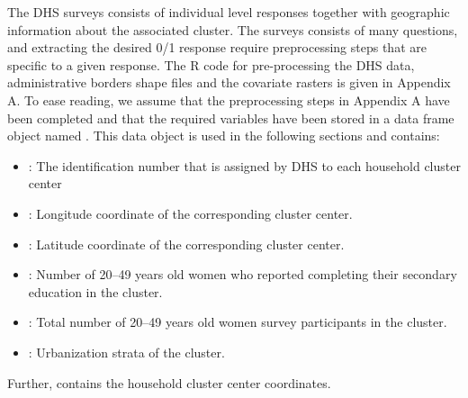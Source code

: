 The DHS surveys consists of individual level responses together with geographic information about the associated cluster. The surveys consists of many questions, and extracting the desired 0/1 response require preprocessing steps that are specific to a given response. 
The R code for pre-processing the DHS data, administrative borders shape files and the covariate rasters is given in Appendix A. To ease reading, we assume that the preprocessing steps in Appendix A have been completed and that the required variables have been stored in a data frame object named . This data object is used in the following sections and contains:
\begin{itemize}
    \item {}: The identification number that is assigned by DHS to each household cluster center
    \item {}: Longitude coordinate of the corresponding cluster center. 
    \item {}: Latitude coordinate of the corresponding cluster center. 
    \item {}: Number of 20--49 years old women who reported completing their secondary education in the cluster. 
    \item {}: Total number of 20--49 years old women survey participants in the cluster. 
    \item {}: Urbanization strata of the cluster.
\end{itemize}
Further,  contains the household cluster center coordinates.


